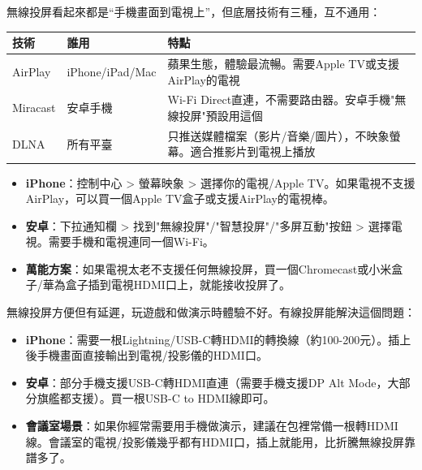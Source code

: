 


無線投屏看起來都是“手機畫面到電視上”，但底層技術有三種，互不通用：

\begin{center}
\begin{tabularx}{\linewidth}{|X|X|X|}
\hline
\textbf{技術} & \textbf{誰用} & \textbf{特點} \tabularnewline
\hline
AirPlay & iPhone/iPad/Mac & 蘋果生態，體驗最流暢。需要Apple TV或支援AirPlay的電視 \tabularnewline
Miracast & 安卓手機 & Wi-Fi Direct直連，不需要路由器。安卓手機"無線投屏"預設用這個 \tabularnewline
DLNA & 所有平臺 & 只推送媒體檔案（影片/音樂/圖片），不映象螢幕。適合推影片到電視上播放 \tabularnewline
\hline
\end{tabularx}
\end{center}


\begin{itemize}
  \item \textbf{iPhone}：控制中心 > 螢幕映象 > 選擇你的電視/Apple TV。如果電視不支援AirPlay，可以買一個Apple TV盒子或支援AirPlay的電視棒。
  \item \textbf{安卓}：下拉通知欄 > 找到"無線投屏"/"智慧投屏"/"多屏互動"按鈕 > 選擇電視。需要手機和電視連同一個Wi-Fi。
  \item \textbf{萬能方案}：如果電視太老不支援任何無線投屏，買一個Chromecast或小米盒子/華為盒子插到電視HDMI口上，就能接收投屏了。
\end{itemize}


無線投屏方便但有延遲，玩遊戲和做演示時體驗不好。有線投屏能解決這個問題：

\begin{itemize}
  \item \textbf{iPhone}：需要一根Lightning/USB-C轉HDMI的轉換線（約100-200元）。插上後手機畫面直接輸出到電視/投影儀的HDMI口。
  \item \textbf{安卓}：部分手機支援USB-C轉HDMI直連（需要手機支援DP Alt Mode，大部分旗艦都支援）。買一根USB-C to HDMI線即可。
  \item \textbf{會議室場景}：如果你經常需要用手機做演示，建議在包裡常備一根轉HDMI線。會議室的電視/投影儀幾乎都有HDMI口，插上就能用，比折騰無線投屏靠譜多了。
\end{itemize}

